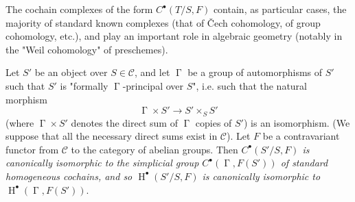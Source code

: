 \begin{remark}\label{fga3.i-a.4.c-remark}
    The cochain complexes of the form $C^\bullet(T/S,F)$ contain, as particular cases, the majority of standard known complexes (that of Čech cohomology, of group cohomology, etc.), and play an important role in algebraic geometry (notably in the "Weil cohomology" of preschemes).
\end{remark}

\label{fga3.i-a.4.d}
\begin{example}\label{fga3.i-a.4-example-1}
    Let $S'$ be an object over $S\in\mathcal{C}$, and let $\operatorname{\Gamma}$ be a group of automorphisms of $S'$ such that $S'$ is "formally $\operatorname{\Gamma}$-principal over $S$", i.e. such that the natural morphism
    \[
        \operatorname{\Gamma}\times S' \to S'\times_S S'
    \]
    (where $\operatorname{\Gamma}\times S'$ denotes the direct sum of $\operatorname{\Gamma}$ copies of $S'$) is an isomorphism.
    (We suppose that all the necessary direct sums exist in $\mathcal{C}$).
    Let $F$ be a contravariant functor from $\mathcal{C}$ to the category of abelian groups.
    Then \emph{$C^\bullet(S'/S,F)$ is canonically isomorphic to the simplicial group $C^\bullet(\operatorname{\Gamma},F(S'))$ of standard homogeneous cochains, and so $\operatorname{H}^\bullet(S'/S,F)$ is canonically isomorphic to $\operatorname{H}^\bullet(\operatorname{\Gamma},F(S'))$}.
\end{example}

